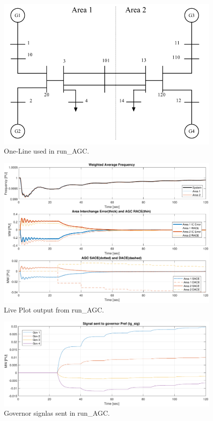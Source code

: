 \begin{figure}[H]
	\centering
	\footnotesize
	\includegraphics[width=\linewidth]{examples/agc/sysOneLineAreas}
	\caption{One-Line used in run\_AGC.}
	\label{fig: runAGC one line}
\end{figure}%

\begin{figure}[H]
	\centering
	\footnotesize
	\includegraphics[width=\linewidth]{examples/agc/run-AGC-1}
	\caption{Live Plot output from run\_AGC.}
	\label{fig: runAGC liveplot}
\end{figure}%

\begin{figure}[H]
	\centering
	\footnotesize
	\includegraphics[width=\linewidth]{examples/agc/run-AGC-2}
	\caption{Governor signlas sent in run\_AGC.}
	\label{fig: runAGC tg}
\end{figure}%

